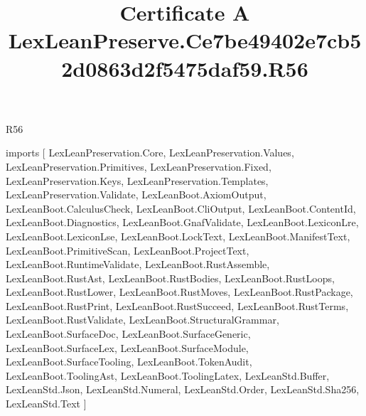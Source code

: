 \begin{lexlean}{R56}
\title{Certificate A LexLeanPreserve.Ce7be49402e7cb52d0863d2f5475daf59.R56}
\begin{coremodule}
imports [
  LexLeanPreservation.Core,
  LexLeanPreservation.Values,
  LexLeanPreservation.Primitives,
  LexLeanPreservation.Fixed,
  LexLeanPreservation.Keys,
  LexLeanPreservation.Templates,
  LexLeanPreservation.Validate,
  LexLeanBoot.AxiomOutput,
  LexLeanBoot.CalculusCheck,
  LexLeanBoot.CliOutput,
  LexLeanBoot.ContentId,
  LexLeanBoot.Diagnostics,
  LexLeanBoot.GnafValidate,
  LexLeanBoot.LexiconLre,
  LexLeanBoot.LexiconLse,
  LexLeanBoot.LockText,
  LexLeanBoot.ManifestText,
  LexLeanBoot.PrimitiveScan,
  LexLeanBoot.ProjectText,
  LexLeanBoot.RuntimeValidate,
  LexLeanBoot.RustAssemble,
  LexLeanBoot.RustAst,
  LexLeanBoot.RustBodies,
  LexLeanBoot.RustLoops,
  LexLeanBoot.RustLower,
  LexLeanBoot.RustMoves,
  LexLeanBoot.RustPackage,
  LexLeanBoot.RustPrint,
  LexLeanBoot.RustSucceed,
  LexLeanBoot.RustTerms,
  LexLeanBoot.RustValidate,
  LexLeanBoot.StructuralGrammar,
  LexLeanBoot.SurfaceDoc,
  LexLeanBoot.SurfaceGeneric,
  LexLeanBoot.SurfaceLex,
  LexLeanBoot.SurfaceModule,
  LexLeanBoot.SurfaceTooling,
  LexLeanBoot.TokenAudit,
  LexLeanBoot.ToolingAst,
  LexLeanBoot.ToolingLatex,
  LexLeanStd.Buffer,
  LexLeanStd.Json,
  LexLeanStd.Numeral,
  LexLeanStd.Order,
  LexLeanStd.Sha256,
  LexLeanStd.Text
]


\end{coremodule}
\end{lexlean}
